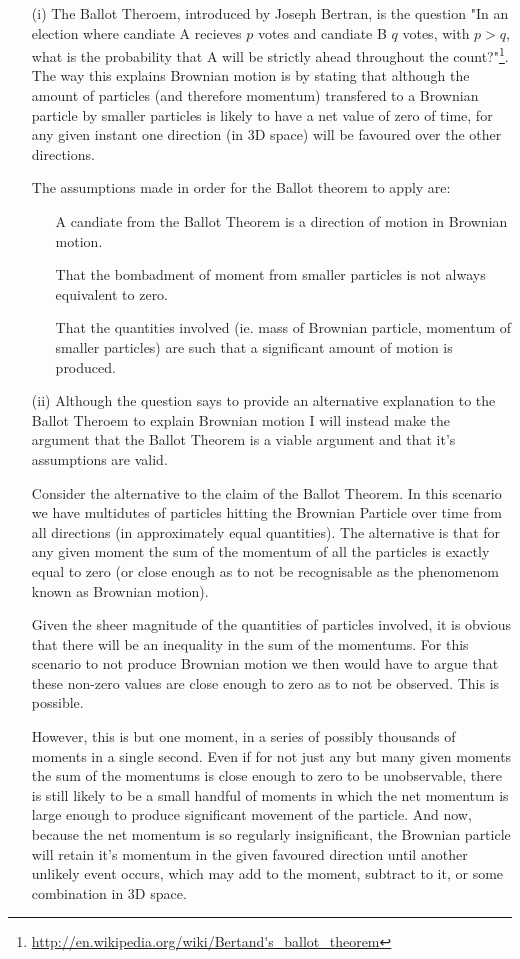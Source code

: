 \documentclass[10pt,a4paper]{article}
\begin{document}
\begin{itemize}
	\item[(i)] The Ballot Theroem, introduced by Joseph Bertran, is the question "In an election where candiate A recieves $p$ votes and candiate B $q$ votes, with $p > q$, what is the probability that A will be strictly ahead throughout the count?"\footnote{\url{http://en.wikipedia.org/wiki/Bertand's_ballot_theorem}}. The way this explains Brownian motion is by stating that although the amount of particles (and therefore momentum) transfered to a Brownian particle by smaller particles is likely to have a net value of zero of time, for any given instant one direction (in 3D space) will be favoured over the other directions.

	The assumptions made in order for the Ballot theorem to apply are:
		\begin{itemize}
			\item[\textbullet] A candiate from the Ballot Theorem is a direction of motion in Brownian motion.
			\item[\textbullet] That the bombadment of moment from smaller particles is not always equivalent to zero.
			\item[\textbullet] That the quantities involved (ie. mass of Brownian particle, momentum of smaller particles) are such that a significant amount of motion is produced.
		\end{itemize}
	\item[(ii)] Although the question says to provide an alternative explanation to the Ballot Theroem to explain Brownian motion I will instead make the argument that the Ballot Theorem is a viable argument and that it's assumptions are valid.

	Consider the alternative to the claim of the Ballot Theorem. In this scenario we have multidutes of particles hitting the Brownian Particle over time from all directions (in approximately equal quantities). The alternative is that for any given moment the sum of the momentum of all the particles is exactly equal to zero (or close enough as to not be recognisable as the phenomenom known as Brownian motion).

	Given the sheer magnitude of the quantities of particles involved, it is obvious that there will be an inequality in the sum of the momentums. For this scenario to not produce Brownian motion we then would have to argue that these non-zero values are close enough to zero as to not be observed. This is possible.

	However, this is but one moment, in a series of possibly thousands of moments in a single second. Even if for not just any but many given moments the sum of the momentums is close enough to zero to be unobservable, there is still likely to be a small handful of moments in which the net momentum is large enough to produce significant movement of the particle. And now, because the net momentum is so regularly insignificant, the Brownian particle will retain it's momentum in the given favoured direction until another unlikely event occurs, which may add to the moment, subtract to it, or some combination in 3D space.


\end{itemize}
\end{document}
